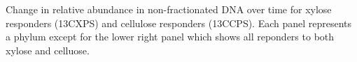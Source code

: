 Change in relative abundance in non-fractionated DNA over time for xylose
responders (13CXPS) and cellulose responders (13CCPS). Each panel represents
a phylum except for the lower right panel which shows all reponders to both
xylose and celluose.    
